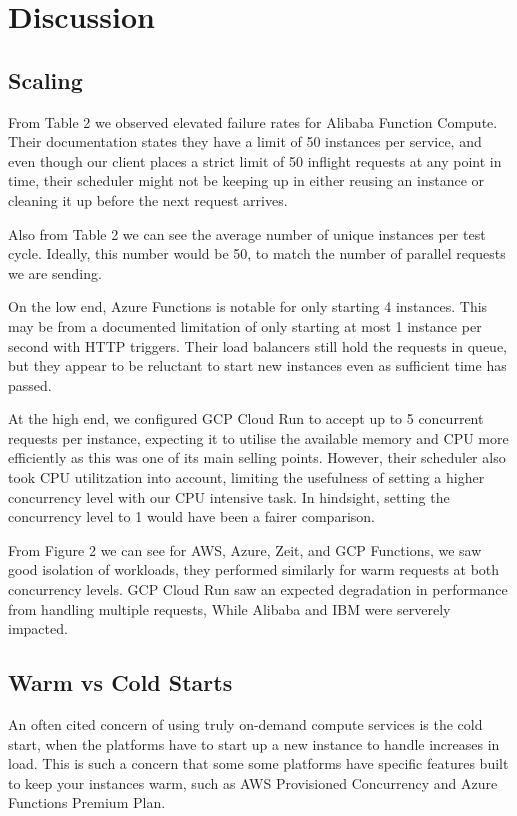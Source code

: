 \documentclass[11pt]{article}
\begin{document}
\section{Discussion}

\subsection{Scaling}
From Table 2 %
we observed elevated failure rates for Alibaba Function Compute.
Their documentation %
states they have a limit of 50 instances per service,
and even though our client places a strict limit of 50 inflight requests at any point in time,
their scheduler might not be keeping up
in either reusing an instance or cleaning it up before the next request arrives.

Also from Table 2 %
we can see the average number of unique instances per test cycle.
Ideally, this number would be 50,
to match the number of parallel requests we are sending.

On the low end,
Azure Functions is notable for only starting 4 instances.
This may be from a documented limitation %
of only starting at most 1 instance per second with HTTP triggers.
Their load balancers still hold the requests in queue,
but they appear to be reluctant to start new instances even as sufficient time has passed.

At the high end,
we configured GCP Cloud Run to accept up to 5 concurrent requests per instance,
expecting it to utilise the available memory and CPU more efficiently as this was one of its main selling points.
However, their scheduler also took CPU utilitzation into account,
limiting the usefulness of setting a higher concurrency level with our CPU intensive task.
In hindsight, setting the concurrency level to 1 would have been a fairer comparison.

From Figure 2 we can see for AWS, Azure, Zeit, and GCP Functions,
we saw good isolation of workloads,
they performed similarly for warm requests at both concurrency levels.
GCP Cloud Run saw an expected degradation in performance from handling multiple requests,
While Alibaba and IBM were serverely impacted.




\subsection{Warm vs Cold Starts}
An often cited concern of using truly on-demand compute services is the cold start,
when the platforms have to start up a new instance to handle increases in load.
This is such a concern that some some platforms have specific features
built to keep your instances warm, such as AWS Provisioned Concurrency %
and Azure Functions Premium Plan.
\end{document}
